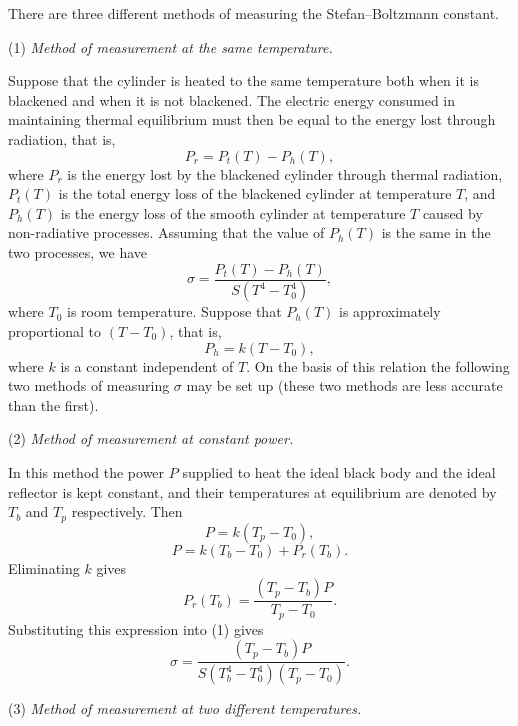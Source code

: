 There are three different methods of measuring the Stefan--Boltzmann constant.

(1) \textit{Method of measurement at the same temperature.}

Suppose that the cylinder is heated to the same temperature both when it is blackened and when it is not blackened. The electric energy consumed in maintaining thermal equilibrium must then be equal to the energy lost through radiation, that is,
\begin{equation*}
P_r=P_t(T)-P_h(T),
\end{equation*}
where $P_r$ is the energy lost by the blackened cylinder through thermal radiation, $P_t(T)$ is the total energy loss of the blackened cylinder at temperature $T$, and $P_h(T)$ is the energy loss of the smooth cylinder at temperature $T$ caused by non-radiative processes. Assuming that the value of $P_h(T)$ is the same in the two processes, we have
\begin{equation*}
\sigma=\frac{P_t(T)-P_h(T)}{S(T^{4}-T_0^{4})},
\end{equation*}
where $T_0$ is room temperature. Suppose that $P_h(T)$ is approximately proportional to $(T-T_0)$, that is,
\begin{equation*}
P_h=k(T-T_0),
\end{equation*}
where $k$ is a constant independent of $T$. On the basis of this relation the following two methods of measuring $\sigma$ may be set up (these two methods are less accurate than the first).

(2) \textit{Method of measurement at constant power.}

In this method the power $P$ supplied to heat the ideal black body and the ideal reflector is kept constant, and their temperatures at equilibrium are denoted by $T_b$ and $T_p$ respectively. Then
\begin{equation*}
P=k(T_p-T_0),
\end{equation*}
\begin{equation*}
P=k(T_b-T_0)+P_r(T_b).
\end{equation*}
Eliminating $k$ gives
\begin{equation*}
P_r(T_b)=\frac{(T_p-T_b)P}{T_p-T_0}.
\end{equation*}
Substituting this expression into (1) gives
\begin{equation*}
\sigma=\frac{(T_p-T_b)P}{S(T_b^{4}-T_0^{4})(T_p-T_0)}.
\end{equation*}

(3) \textit{Method of measurement at two different temperatures.}

